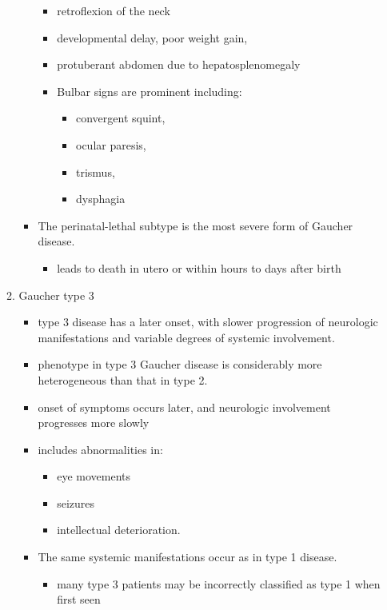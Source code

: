 \documentclass{scrartcl}
\begin{document}
\begin{enumerate}
\begin{enumerate}
\begin{itemize}
\begin{itemize}
\item retroflexion of the neck
\item developmental delay, poor weight gain,
\item protuberant abdomen due to hepatosplenomegaly
\item Bulbar signs are prominent including:
\begin{itemize}
\item convergent squint,
\item ocular paresis,
\item trismus,
\item dysphagia
\end{itemize}
\end{itemize}

\item The perinatal-lethal subtype is the most severe form of Gaucher
disease.

\begin{itemize}
\item leads to death in utero or within hours to days after
birth
\end{itemize}
\end{itemize}

\item Gaucher type 3
\label{sec:org7f62094}
\begin{itemize}
\item type 3 disease has a later onset, with slower progression of
neurologic manifestations and variable degrees of systemic
involvement.
\item phenotype in type 3 Gaucher disease is considerably more
heterogeneous than that in type 2.

\item onset of symptoms occurs later, and neurologic involvement
progresses more slowly

\item includes abnormalities in:
\begin{itemize}
\item eye movements
\item seizures
\item intellectual deterioration.
\end{itemize}

\item The same systemic manifestations occur as in type 1 disease.
\begin{itemize}
\item many type 3 patients may be incorrectly classified as type 1 when
first seen
\end{itemize}
\end{itemize}


\end{enumerate}
\end{enumerate}
\end{document}
